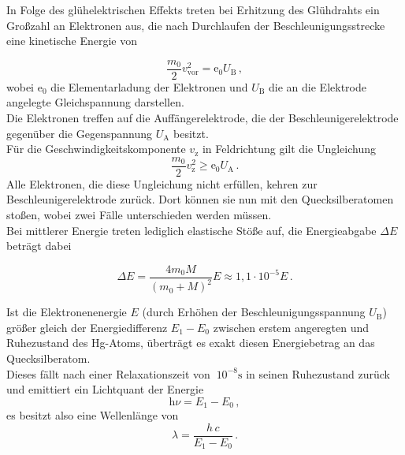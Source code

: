 In Folge des glühelektrischen Effekts treten bei Erhitzung des Glühdrahts
ein Großzahl an Elektronen aus, die nach Durchlaufen der Beschleunigungsstrecke
eine kinetische Energie von

\begin{equation*}
    \dfrac{m_0}{2} v^2_\text{vor} = \text{e}_0 U_\text{B} \,,
\end{equation*}
wobei $\text{e}_0$ die Elementarladung der Elektronen und $U_\text{B}$
die an die Elektrode angelegte Gleichspannung darstellen. \\

Die Elektronen treffen auf die Auffängerelektrode, die der Beschleunigerelektrode gegenüber
die Gegenspannung $U_\text{A}$ besitzt. \\

Für die Geschwindigkeitskomponente $v_\text{z}$ in Feldrichtung gilt die Ungleichung
\begin{equation*}
    \dfrac{m_0}{2} v^2_\text{z} \geq \text{e}_0 U_\text{A} \,.
\end{equation*}
Alle Elektronen, die diese Ungleichung nicht erfüllen, kehren zur Beschleunigerelektrode zurück.
Dort können sie nun mit den Quecksilberatomen stoßen, wobei zwei Fälle unterschieden werden müssen. \\

Bei mittlerer Energie treten lediglich elastische Stöße auf, die
Energieabgabe $\Delta E$ beträgt dabei

\begin{equation*}
    \Delta E = \frac{4 m_0 M}{(m_0 + M)^2} E \approx 1,1 \cdot 10^{-5} E \,.
\end{equation*}

Ist die Elektronenenergie $E$ (durch Erhöhen der Beschleunigungsspannung $U_\text{B}$)
größer gleich der Energiedifferenz $E_1 - E_0$ zwischen erstem angeregten und Ruhezustand
des Hg-Atoms, überträgt es exakt diesen Energiebetrag an das Quecksilberatom. \\

Dieses fällt nach einer Relaxationszeit von $~10^{-8} \unit{\second}$
in seinen Ruhezustand zurück und emittiert ein Lichtquant der Energie
\begin{equation*}
    \text{h} \nu = E_1 - E_0 \,,
\end{equation*}
es besitzt also eine Wellenlänge von
\begin{equation}
    \lambda = \dfrac{h \, c}{E_1 - E_0} \,.
    \label{eq:emittwellläng}
\end{equation}


